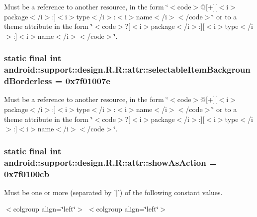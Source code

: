 Must be a reference to another resource, in the form \char`\"{}$<$code$>$@\mbox{[}+\mbox{]}\mbox{[}$<$i$>$package$<$/i$>$:\mbox{]}$<$i$>$type$<$/i$>$:$<$i$>$name$<$/i$>$$<$/code$>$\char`\"{} or to a theme attribute in the form \char`\"{}$<$code$>$?\mbox{[}$<$i$>$package$<$/i$>$:\mbox{]}\mbox{[}$<$i$>$type$<$/i$>$:\mbox{]}$<$i$>$name$<$/i$>$$<$/code$>$\char`\"{}. \hypertarget{classandroid_1_1support_1_1design_1_1_r_1_1attr_c57fce3a6d6e1e3101d80d59547290f4}{
\subsubsection[{selectableItemBackgroundBorderless}]{\setlength{\rightskip}{0pt plus 5cm}static final int android::support::design.R.R::attr::selectableItemBackgroundBorderless = 0x7f01007e}}
\label{classandroid_1_1support_1_1design_1_1_r_1_1attr_c57fce3a6d6e1e3101d80d59547290f4}


Must be a reference to another resource, in the form \char`\"{}$<$code$>$@\mbox{[}+\mbox{]}\mbox{[}$<$i$>$package$<$/i$>$:\mbox{]}$<$i$>$type$<$/i$>$:$<$i$>$name$<$/i$>$$<$/code$>$\char`\"{} or to a theme attribute in the form \char`\"{}$<$code$>$?\mbox{[}$<$i$>$package$<$/i$>$:\mbox{]}\mbox{[}$<$i$>$type$<$/i$>$:\mbox{]}$<$i$>$name$<$/i$>$$<$/code$>$\char`\"{}. \hypertarget{classandroid_1_1support_1_1design_1_1_r_1_1attr_da37c86fca33a0d34f07e4291961ea1b}{
\subsubsection[{showAsAction}]{\setlength{\rightskip}{0pt plus 5cm}static final int android::support::design.R.R::attr::showAsAction = 0x7f0100cb}}
\label{classandroid_1_1support_1_1design_1_1_r_1_1attr_da37c86fca33a0d34f07e4291961ea1b}


Must be one or more (separated by '$|$') of the following constant values. \begin{TabularC}{0}
\hline
\end{TabularC}
$<$colgroup align=\char`\"{}left\char`\"{}$>$ $<$colgroup align=\char`\"{}left\char`\"{}$>$ 

